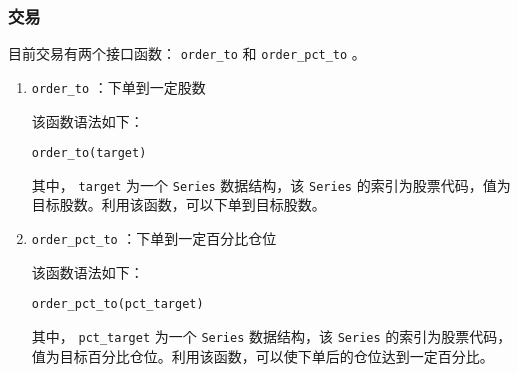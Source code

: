 \documentclass[11pt]{ctexart}
\begin{document}
\subsubsection{交易}
\label{sec:org5a0d209}

目前交易有两个接口函数： \texttt{order\_to} 和 \texttt{order\_pct\_to} 。

\begin{enumerate}
\item \texttt{order\_to} ：下单到一定股数

该函数语法如下：

\lstset{language=Python,label= ,caption= ,captionpos=b,numbers=none}
\begin{lstlisting}
order_to(target)
\end{lstlisting}

其中， \texttt{target} 为一个 \texttt{Series} 数据结构，该 \texttt{Series} 的索引为股票代码，值为
目标股数。利用该函数，可以下单到目标股数。

\item \texttt{order\_pct\_to} ：下单到一定百分比仓位

该函数语法如下：

\lstset{language=Python,label= ,caption= ,captionpos=b,numbers=none}
\begin{lstlisting}
order_pct_to(pct_target)
\end{lstlisting}

其中， \texttt{pct\_target} 为一个 \texttt{Series} 数据结构，该 \texttt{Series} 的索引为股票代码，
值为目标百分比仓位。利用该函数，可以使下单后的仓位达到一定百分比。
\end{enumerate}
\end{document}
